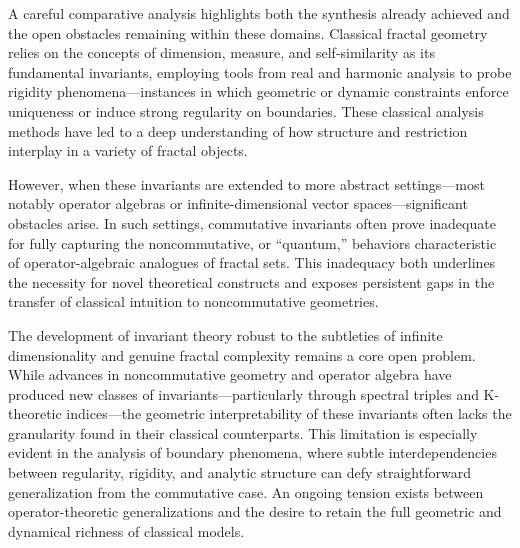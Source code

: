 \documentclass[sigconf]{acmart}
\begin{document}
A careful comparative analysis highlights both the synthesis already achieved and the open obstacles remaining within these domains. Classical fractal geometry relies on the concepts of dimension, measure, and self-similarity as its fundamental invariants, employing tools from real and harmonic analysis to probe rigidity phenomena—instances in which geometric or dynamic constraints enforce uniqueness or induce strong regularity on boundaries. These classical analysis methods have led to a deep understanding of how structure and restriction interplay in a variety of fractal objects.

However, when these invariants are extended to more abstract settings—most notably operator algebras or infinite-dimensional vector spaces—significant obstacles arise. In such settings, commutative invariants often prove inadequate for fully capturing the noncommutative, or ``quantum,'' behaviors characteristic of operator-algebraic analogues of fractal sets. This inadequacy both underlines the necessity for novel theoretical constructs and exposes persistent gaps in the transfer of classical intuition to noncommutative geometries.

The development of invariant theory robust to the subtleties of infinite dimensionality and genuine fractal complexity remains a core open problem. While advances in noncommutative geometry and operator algebra have produced new classes of invariants—particularly through spectral triples and K-theoretic indices—the geometric interpretability of these invariants often lacks the granularity found in their classical counterparts. This limitation is especially evident in the analysis of boundary phenomena, where subtle interdependencies between regularity, rigidity, and analytic structure can defy straightforward generalization from the commutative case. An ongoing tension exists between operator-theoretic generalizations and the desire to retain the full geometric and dynamical richness of classical models.
\end{document}
